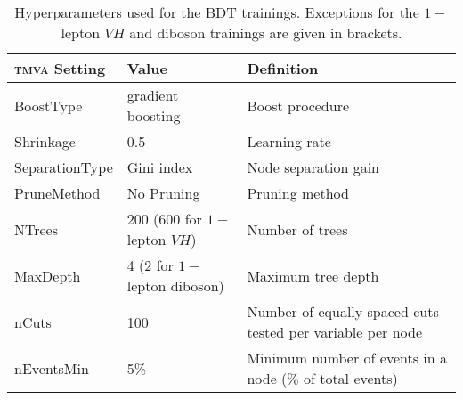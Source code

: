 \begin{table}[htbp]
  \begin{center}
    \begin{tabular}{llp{}}
      \toprule
      \textsc{tmva} Setting & Value & Definition \\
      \midrule
      BoostType & gradient boosting & Boost procedure \\
      Shrinkage & 0.5 & Learning rate \\
      SeparationType & Gini index & Node separation gain \\
      PruneMethod & No Pruning & Pruning method \\
      NTrees & 200 (600 for $1-$lepton $VH$) & Number of trees \\
      MaxDepth & 4 (2 for $1-$lepton diboson) & Maximum tree depth \\
      nCuts & 100 & Number of equally spaced cuts tested per variable per node \\
      nEventsMin & 5\% & Minimum number of events in a node (\% of total events) \\
      \bottomrule
    \end{tabular}
    \caption{Hyperparameters used for the BDT trainings. Exceptions for the
      $1-$lepton $VH$ and diboson trainings are given in brackets.}
    \label{tab:BDTSetup}
  \end{center}
\end{table}